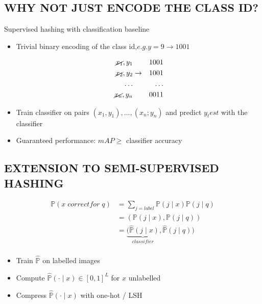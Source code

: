 \documentclass[conference]{IEEEtran}
\begin{document}
\subsection{WHY NOT JUST ENCODE THE CLASS ID?}
Supervised hashing with classification baseline
\begin{itemize}
\item Trivial binary encoding of the class id,$ e.g. y=9 \rightarrow 1001$
\centering

\begin{eqnarray}
\cancel{x_1}, y_1  & & 1001    \\
\cancel{x_2}, y_2  & \rightarrow & 1001   \\
\dots  & & \dots \\
\cancel{x_n}, y_n  & & 0011
\end{eqnarray}
\item Train classifier on pairs $(x_1, y_1),  \dots ,(x_n; y_n)$ and predict $y_test$ with the classifier
\item Guaranteed performance: $mAP \geq$ classifier accuracy
\end{itemize}

\subsection{EXTENSION TO SEMI-SUPERVISED HASHING}
\begin{equation}
\begin{split}
	\mathbb{P}(x\;correct for\; q) & = \sum_{j=label} \mathbb{P}(j\mid x)\mathbb{P}(j\mid q)  \\
	&=(\mathbb{P}(j\mid x),\mathbb{P}(j\mid q))  \\
	&=\underbrace{(\hat{\mathbb{P}}(j\mid x)}_{classifier},\hat{\mathbb{P}}(j\mid q))  \\
\end{split}
\end{equation}
\begin{itemize}
    \item Train $\hat{\mathbb{P}}$ on labelled images
    \item Compute $\hat{\mathbb{P}}(\cdot\mid x) \in\left[0,1\right]^{L}$ for $x$ unlabelled
    \item Compress $\hat{\mathbb{P}}(\cdot\mid x)$ with one-hot / LSH
\end{itemize}
\end{document}
